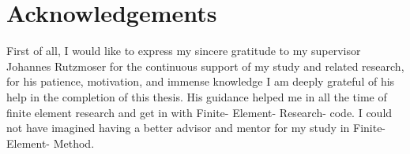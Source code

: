\chapter*{Acknowledgements}




First of all, I would like to express my sincere gratitude to my supervisor Johannes Rutzmoser for the continuous support of my study and related research, for his patience, motivation, and immense knowledge I am deeply grateful of his help in the completion of this thesis.  His guidance helped me in all the time of finite element research and get in with Finite- Element- Research- code. I could not have imagined having a better advisor and mentor for my study in Finite- Element- Method. 
